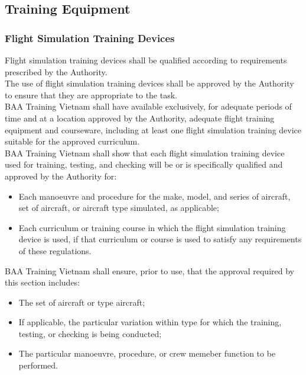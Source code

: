     \subsection{Training Equipment}
        \subsubsection{Flight Simulation Training Devices}
            Flight simulation training devices shall be qualified according to requirements prescribed by the Authority. \\
            \vspace{3mm}
            The use of flight simulation training devices shall be approved by the Authority to ensure that they are appropriate to the task. \\ 
            \vspace{3mm}
            BAA Training Vietnam shall have available exclusively, for adequate periods of time and at a location approved by the Authority, adequate flight 
            training equipment and courseware, including at least one flight simulation training device suitable for the approved curriculum. \\ 
            \vspace{3mm}
            BAA Training Vietnam shall show that each flight simulation training device used for training, testing, and checking will be or is specifically 
            qualified and approved by the Authority for:
            \begin{itemize}
                \item Each manoeuvre and procedure for the make, model, and series of aircraft, set of aircraft, or aircraft type simulated, as applicable;
                \item Each curriculum or training course in which the flight simulation training device is used, if that curriculum or course is used to satisfy 
                any requirements of these regulations.
            \end{itemize}
            BAA Training Vietnam shall ensure, prior to use, that the approval required by this section includes:
            \begin{itemize}
                \item The set of aircraft or type aircraft;
                \item If applicable, the particular variation within type for which the training, testing, or checking is being conducted;
                \item The particular manoeuvre, procedure, or crew memeber function to be performed.
            \end{itemize}
